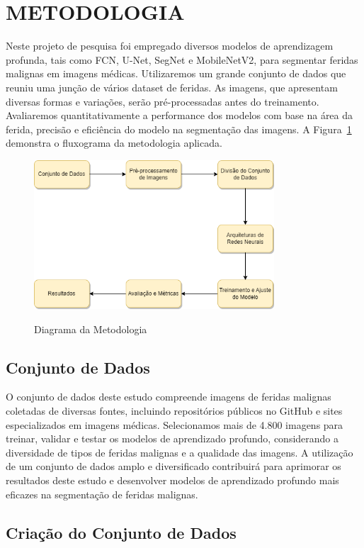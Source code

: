 \section{METODOLOGIA}
Neste projeto de pesquisa foi empregado diversos modelos de aprendizagem profunda, tais como \ac{FCN}, \ac{U-Net}, \ac{SegNet} e \ac{MobileNetV2}, para segmentar feridas malignas em imagens médicas. Utilizaremos um grande conjunto de dados que reuniu uma junção de vários dataset de feridas. As imagens, que apresentam diversas formas e variações, serão pré-processadas antes do treinamento. Avaliaremos quantitativamente a performance dos modelos com base na área da ferida, precisão e eficiência do modelo na segmentação das imagens. A Figura~\ref{fig:diagrama} demonstra o fluxograma da metodologia aplicada.

\begin{figure}[htbp]
    \centering
    \caption{Diagrama da Metodologia}
    \includegraphics[width=0.8\textwidth]{img/Diagrama.png}
    \label{fig:diagrama}
\end{figure}

\subsection{Conjunto de Dados}
    O conjunto de dados deste estudo compreende imagens de feridas malignas coletadas de diversas fontes, incluindo repositórios públicos no GitHub e sites especializados em imagens médicas. Selecionamos mais de 4.800 imagens para treinar, validar e testar os modelos de aprendizado profundo, considerando a diversidade de tipos de feridas malignas e a qualidade das imagens. A utilização de um conjunto de dados amplo e diversificado contribuirá para aprimorar os resultados deste estudo e desenvolver modelos de aprendizado profundo mais eficazes na segmentação de feridas malignas.
    
\subsection{Criação do Conjunto de Dados}
    
